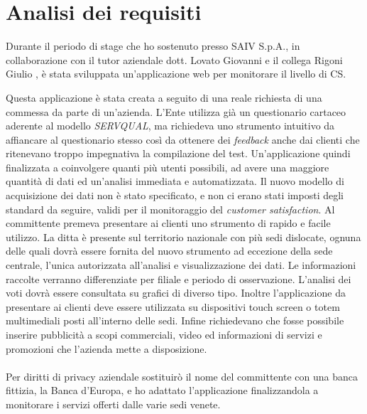 \section{Analisi dei requisiti}
Durante il periodo di stage che ho sostenuto presso SAIV S.p.A., in
collaborazione con il tutor aziendale dott. Lovato Giovanni e il collega Rigoni
Giulio , è stata sviluppata un'applicazione web per monitorare il livello di
\ac{CS}.

Questa applicazione è stata creata a seguito di una reale richiesta di una
commessa da parte di un'azienda. 
L'Ente utilizza già un questionario cartaceo aderente al modello
\emph{SERVQUAL}, ma richiedeva uno strumento intuitivo da affiancare al
questionario stesso così da ottenere dei \emph{feedback} anche dai clienti che
ritenevano troppo impegnativa la compilazione del test. 
Un'applicazione quindi finalizzata a coinvolgere
quanti più utenti possibili, ad avere una maggiore quantità di dati ed
un'analisi immediata e automatizzata. Il nuovo modello di acquisizione dei dati non è stato
specificato, e non ci erano stati imposti degli standard da seguire, validi
per il monitoraggio del \emph{customer satisfaction}. Al committente premeva
presentare ai clienti uno strumento di rapido e facile utilizzo. 
La ditta è presente sul territorio nazionale con più sedi dislocate, ognuna
delle quali dovrà essere fornita del nuovo strumento ad eccezione della sede
centrale, l'unica autorizzata all'analisi e visualizzazione dei dati. Le informazioni
raccolte verranno differenziate per filiale e periodo di osservazione. L'analisi
dei voti dovrà essere consultata su grafici di diverso tipo.
Inoltre l'applicazione da presentare ai clienti deve essere utilizzata su
dispositivi touch screen o totem multimediali posti all'interno delle sedi.
Infine richiedevano che fosse possibile inserire pubblicità a scopi commerciali,
video ed informazioni di servizi e promozioni che l'azienda mette a
disposizione.
\\\\ 
Per diritti di privacy aziendale sostituirò il nome del committente con
una banca fittizia, la Banca d'Europa, e ho adattato l'applicazione
finalizzandola a monitorare i servizi offerti dalle varie sedi venete.